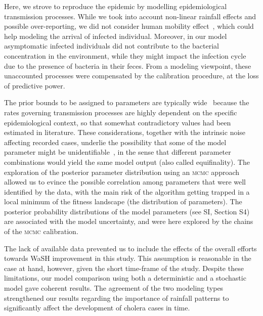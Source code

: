Here, we strove to reproduce the epidemic by modelling epidemiological transmission processes. %
While we took into account non-linear rainfall effects and possible over-reporting, we did not consider human mobility effect~\cite{gatto12,bertuzzo10,mari15,perezsaez17a}, which could help modeling the arrival of infected individual.  Moreover, in our model asymptomatic infected individuals did not contribute to the bacterial concentration in the environment, while they might impact the infection cycle due to the presence of bacteria in their feces. From a modeling viewpoint, these unaccounted processes were compensated by the calibration procedure, at the loss of predictive power.

The prior bounds to be assigned to parameters are typically wide~\cite{akman_2016} because the rates governing transmission processes are highly dependent on the specific epidemiological context, so that somewhat contradictory values had been estimated in literature. These considerations, together with the intrinsic noise affecting recorded cases, underlie the possibility that some of the model parameter might be unidentifiable~\cite{eisenberg_identifiability_2013}, in the sense that different parameter combinations would yield the same model output (also called equifinality). 
The exploration of the posterior parameter distribution using an \textsc{mcmc} approach allowed us to evince the possible correlation among parameters that were well identified by the data, with the main risk of the algorithm getting trapped in a local minimum of the fitness landscape (the distribution of parameters). The posterior probability distributions of the model parameters (see SI, Section S4) are associated with the model uncertainty, and were here explored by the chains of the \textsc{mcmc} calibration.

The lack of available data prevented us to include the effects of the overall efforts towards WaSH improvement in this study. This assumption is reasonable in the case at hand, however, given the short time-frame of the study. %
Despite these limitations, our model comparison using both a deterministic and a stochastic model gave coherent results. The agreement of the two modeling types strengthened our results regarding the importance of rainfall patterns to significantly affect the development of cholera cases in time.

